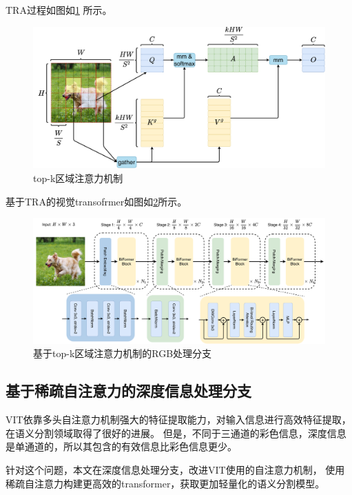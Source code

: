 TRA过程如图如\ref{图：top-k区域注意力机制} 所示。
\begin{figure}[h]
	\centering
	\includegraphics[width=\textwidth]{figures/top-k区域注意力机制.pdf}
	\caption{top-k区域注意力机制}
	\label{图：top-k区域注意力机制}
\end{figure}

基于TRA的视觉transofrmer如图如\ref{图：基于top-k区域注意力机制的RGB处理分支}所示。
\begin{figure}[h]
	\centering
	\includegraphics[width=\textwidth]{figures/基于top-k区域注意力机制的RGB处理分支.pdf}
	\caption{基于top-k区域注意力机制的RGB处理分支}
	\label{图：基于top-k区域注意力机制的RGB处理分支}
\end{figure}




\subsection{基于稀疏自注意力的深度信息处理分支}
VIT依靠多头自注意力机制强大的特征提取能力，对输入信息进行高效特征提取，在语义分割领域取得了很好的进展。
但是，不同于三通道的彩色信息，深度信息是单通道的，所以其包含的有效信息比彩色信息更少。

针对这个问题，本文在深度信息处理分支，改进VIT使用的自注意力机制，
使用稀疏自注意力构建更高效的transformer，获取更加轻量化的语义分割模型。


